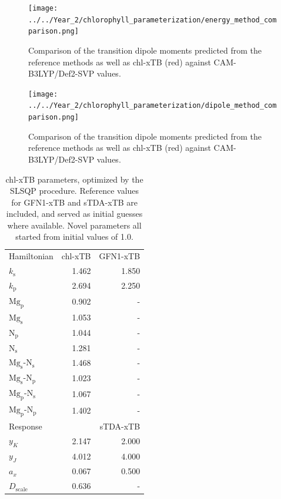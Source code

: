 \begin{figure}
    \centering
    \texttt{[image: ../../Year\_2/chlorophyll\_parameterization/energy\_method\_comparison.png]}
    \caption{Comparison of the \Qy transition dipole moments predicted from the
    reference methods as well as chl-xTB (red) against CAM-B3LYP/Def2-SVP values.}
    \label{fig:energy_camb3lyp_scatter}
\end{figure}

\begin{figure}
    \centering
    \texttt{[image: ../../Year\_2/chlorophyll\_parameterization/dipole\_method\_comparison.png]}
    \caption{Comparison of the \Qy transition dipole moments predicted from the
    reference methods as well as chl-xTB (red) against CAM-B3LYP/Def2-SVP values.}
    \label{fig:dipole_camb3lyp_scatter}
\end{figure}

\begin{table}
    \centering
    \begin{tabular}{|| l r | r ||}
    \hline
    Hamiltonian & chl-xTB & GFN1-xTB \\
    $k_\text{s}$ & 1.462 & 1.850 \\
    $k_\text{p}$ & 2.694 & 2.250 \\

    $\text{Mg}_\text{p}$ & 0.902 & - \\
    $\text{Mg}_\text{s}$ & 1.053 & - \\
    $\text{N}_\text{p}$ & 1.044 & - \\
    $\text{N}_\text{s}$ & 1.281 & - \\

    $\text{Mg}_\text{s}$-$\text{N}_\text{s}$ & 1.468 & - \\
    $\text{Mg}_\text{s}$-$\text{N}_\text{p}$ & 1.023 & - \\
    $\text{Mg}_\text{p}$-$\text{N}_\text{s}$ & 1.067 & - \\
    $\text{Mg}_\text{p}$-$\text{N}_\text{p}$ & 1.402 & - \\

    \hline\hline
    Response & & sTDA-xTB\\
    $y_K$ & 2.147 & 2.000 \\
    $y_J$ & 4.012 & 4.000 \\
    $a_x$ & 0.067 & 0.500 \\
    $D_{\text{scale}}$ & 0.636 & - \\
    \hline
    \end{tabular}
    \caption{chl-xTB parameters, optimized by the SLSQP procedure. Reference values
    for GFN1-xTB and sTDA-xTB are included, and served as initial guesses where 
    available. Novel parameters all started from initial values of 1.0.}
    \label{table:chl_params}
\end{table}


